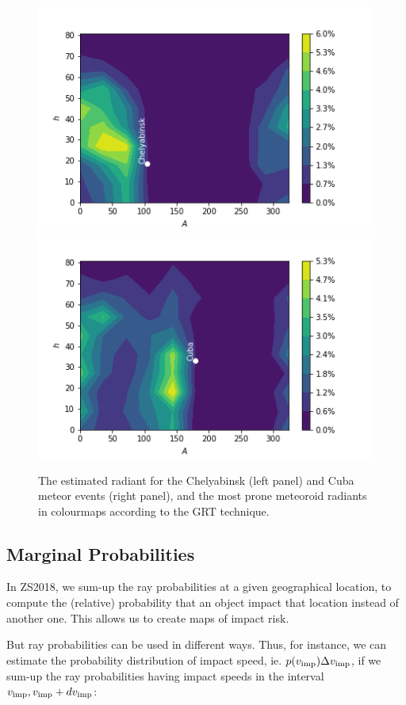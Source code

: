 \documentclass[fleqn,usenatbib]{mnras}
\newcommand{\sub}[1]{_{\rm #1}}
\newcommand{\vimp}{v\sub{imp}}
\begin{document}
\begin{figure}
\centering
\includegraphics[scale=0.5]{Azh-Chelyabinsk.png}\hspace{1em}%
\includegraphics[scale=0.5]{Azh-Cuba.png}
\caption{The estimated radiant for the Chelyabinsk (left panel) and Cuba meteor events (right panel), and the most prone meteoroid radiants in colourmaps according to the GRT technique.}
\label{fig:Azh}
\end{figure}

\subsection{Marginal Probabilities}

In ZS2018, we sum-up the ray probabilities at a given geographical location, to compute the (relative) probability that an object impact that location instead of another one.  This allows us to create maps of impact risk.  

But ray probabilities can be used in different ways. Thus, for instance, we can estimate the probability distribution of impact speed, ie.  $p(\vimp)\Delta \vimp$, if we sum-up the ray probabilities having impact speeds in the interval $\vimp, \vimp+d\vimp$:
\end{document}
